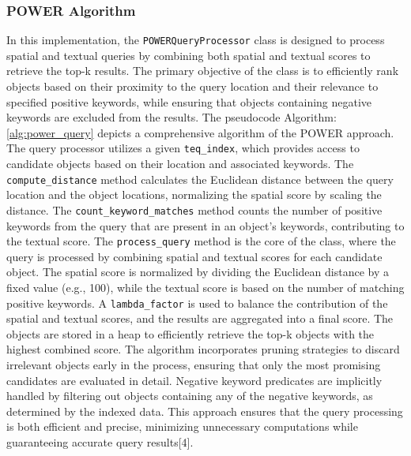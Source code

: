\documentclass[conference]{IEEEtran}
\begin{document}
    \subsubsection{\textbf{POWER Algorithm}}
    In this implementation, the \texttt{POWERQueryProcessor} class is designed to process spatial and textual queries by combining both spatial and textual scores to retrieve the top-k results. The primary objective of the class is to efficiently rank objects based on their proximity to the query location and their relevance to specified positive keywords, while ensuring that objects containing negative keywords are excluded from the results. The pseudocode Algorithm: \ref{alg:power_query} depicts a comprehensive algorithm of the POWER approach.
    The query processor utilizes a given \texttt{teq\_index}, which provides access to candidate objects based on their location and associated keywords. The \texttt{compute\_distance} method calculates the Euclidean distance between the query location and the object locations, normalizing the spatial score by scaling the distance. The \texttt{count\_keyword\_matches} method counts the number of positive keywords from the query that are present in an object's keywords, contributing to the textual score.
    The \texttt{process\_query} method is the core of the class, where the query is processed by combining spatial and textual scores for each candidate object. The spatial score is normalized by dividing the Euclidean distance by a fixed value (e.g., 100), while the textual score is based on the number of matching positive keywords. A \texttt{lambda\_factor} is used to balance the contribution of the spatial and textual scores, and the results are aggregated into a final score. The objects are stored in a heap to efficiently retrieve the top-k objects with the highest combined score.
    The algorithm incorporates pruning strategies to discard irrelevant objects early in the process, ensuring that only the most promising candidates are evaluated in detail. Negative keyword predicates are implicitly handled by filtering out objects containing any of the negative keywords, as determined by the indexed data. This approach ensures that the query processing is both efficient and precise, minimizing unnecessary computations while guaranteeing accurate query results[4]. \\
    
\end{document}
